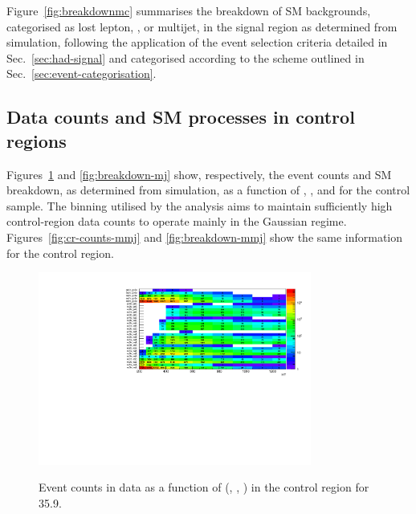 Figure~\ref{fig:breakdownmc} summarises the breakdown of SM
backgrounds, categorised as lost lepton, \znunuj, or multijet, in the
signal region as determined from simulation, following the application
of the event selection criteria detailed in Sec.~\ref{sec:had-signal}
and categorised according to the scheme outlined in
Sec.~\ref{sec:event-categorisation}.

\subsection{Data counts and SM processes in control regions}
\label{sec:crbreakdown}

Figures~\ref{fig:cr-counts-mj} and \ref{fig:breakdown-mj} show,
respectively, the event counts and SM breakdown, as determined from
simulation, as a function of \njet, \nb, and \scalht for the \mj
control sample. The binning utilised by the analysis aims to maintain
sufficiently high control-region data counts to operate mainly in the
Gaussian regime. Figures~\ref{fig:cr-counts-mmj} and
\ref{fig:breakdown-mmj} show the same information for the \mmj control
region.

\clearpage
\begin{figure}[h!]
  \begin{center}
    {\includegraphics[width=0.8\textwidth]{figures/control_regions/SingleMu.pdf}} 
    \caption{Event counts in data as a function of (\njet, \nb,
      \scalht) in the \mj control region for 35.9\fbinv.}
    \label{fig:cr-counts-mj}
  \end{center}
\end{figure}

